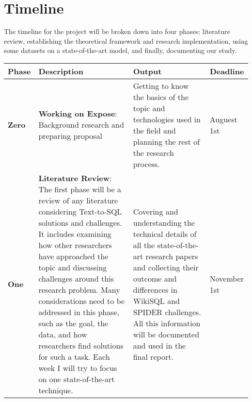 
\newpage
\section{Timeline}

The timeline for the project will be broken down into four phases: literature review, establishing the theoretical framework and research implementation, using some datasets on a state-of-the-art model, and finally, documenting our study.

\begin{tabular}{|l|p{6.5cm}|p{5cm}|l|}
    \hline
    \textbf{Phase} & \textbf{Description}                                                                                                                                                                                                                                                                                                                                                                                                                                                    & \textbf{Output}                                                                                                                                                                                                                                    & \textbf{Deadline} \\
    \hline
    \textbf{Zero}  & \textbf{Working on Expose}: Background research and preparing proposal                                                                                                                                                                                                                                                                                                                                                                                                  & Getting to know the basics of the topic and technologies used in the field and planning the rest of the research process.                                                                                                                          & Auguest 1st       \\
    \hline
    \textbf{One}   & \textbf{Literature Review}: The first phase will be a review of any literature considering Text-to-SQL solutions and challenges. It includes examining how other researchers have approached the topic and discussing challenges around this research problem. Many considerations need to be addressed in this phase, such as the goal, the data, and how researchers find solutions for such a task. Each week I will try to focus on one state-of-the-art technique. & Covering and understanding the technical details of all the state-of-the-art research papers and collecting their outcome and differences in WikiSQL and SPIDER challenges.  All this information will be documented and used in the final report. & November 1st      \\

\end{tabular}
